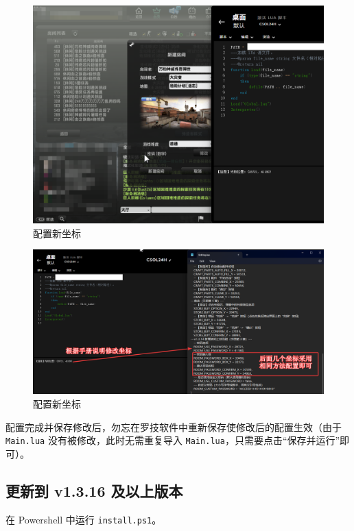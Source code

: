 \begin{figure}[H]
    \Centering
    \includegraphics[width=\textwidth]{docs/assets/update/config_new_positions_01.png}
    \caption{配置新坐标}
\end{figure}

\begin{figure}[H]
    \Centering
    \includegraphics[width=\textwidth]{docs/assets/update/config_new_positions_02.png}
    \caption{配置新坐标}
\end{figure}

配置完成并保存修改后，勿忘在罗技软件中重新保存使修改后的配置生效（由于 \lstinline{Main.lua} 没有被修改，此时无需重复导入 \lstinline{Main.lua}，只需要点击“保存并运行”即可）。

\subsection{更新到 v1.3.16 及以上版本}

在 Powershell 中运行 \lstinline{install.ps1}。


